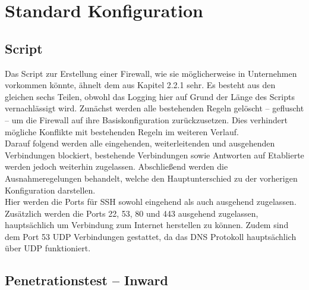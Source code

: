 \newpage
\section{Standard Konfiguration}



\subsection{Script}
Das Script zur Erstellung einer Firewall, wie sie möglicherweise in Unternehmen vorkommen könnte, ähnelt dem aus Kapitel 2.2.1 sehr. 
Es besteht aus den gleichen sechs Teilen, obwohl das Logging hier auf Grund der Länge des Scripts vernachlässigt wird.
Zunächst werden alle bestehenden Regeln gelöscht – gefluscht – um die Firewall auf ihre Basiskonfiguration zurückzusetzen. Dies verhindert mögliche Konflikte mit bestehenden Regeln im weiteren Verlauf. \\
Darauf folgend werden alle eingehenden, weiterleitenden und ausgehenden Verbindungen blockiert, bestehende Verbindungen sowie Antworten auf Etablierte werden jedoch weiterhin zugelassen. 
Abschließend werden die Ausnahmeregelungen behandelt, welche den Hauptunterschied zu der vorherigen Konfiguration darstellen. \\
Hier werden die Ports für SSH sowohl eingehend als auch ausgehend zugelassen. Zusätzlich werden die Ports 22, 53, 80 und 443 ausgehend zugelassen, hauptsächlich um Verbindung zum Internet herstellen zu können. 
Zudem sind dem Port 53 UDP Verbindungen gestattet, da das DNS Protokoll hauptsächlich über UDP funktioniert. 

\subsection{Penetrationstest – Inward}
